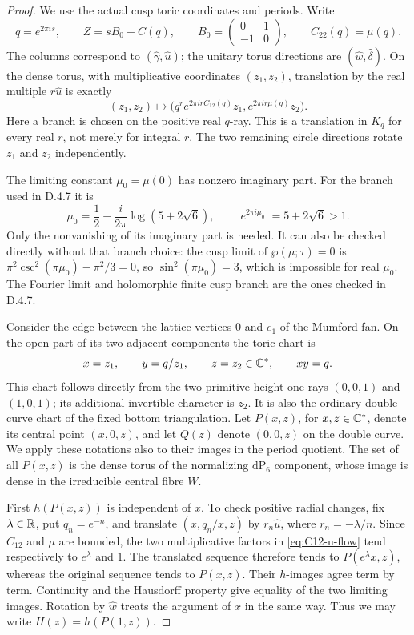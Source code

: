 \begin{proof}
We use the actual cusp toric coordinates and periods. Write
\[
 q=e^{2\pi i s},\qquad
 Z=sB_0+C(q),\qquad
 B_0=\begin{pmatrix}0&1\\-1&0\end{pmatrix},
 \qquad C_{22}(q)=\mu(q).
\]
The columns correspond to $(\widehat\gamma,\widehat u)$;
the unitary torus directions are $(\widehat w,\widehat\delta)$.
On the dense torus, with multiplicative coordinates $(z_1,z_2)$,
translation by the real multiple $r\widehat u$ is exactly
\begin{equation}\label{eq:C12-u-flow}
 (z_1,z_2)\longmapsto
 \bigl(q^r e^{2\pi i r C_{12}(q)}z_1,
             e^{2\pi i r\mu(q)}z_2\bigr).
\end{equation}
Here a branch is chosen on the positive real $q$-ray. This is a
translation in $K_q$ for every real $r$, not merely for integral $r$.
The two remaining circle directions rotate $z_1$ and $z_2$
independently.

The limiting constant $\mu_0=\mu(0)$ has nonzero imaginary part.
For the branch used in D.4.7 it is
\[
 \mu_0=\frac12-\frac{i}{2\pi}\log(5+2\sqrt6),\qquad
 |e^{2\pi i\mu_0}|=5+2\sqrt6>1.
\]
Only the nonvanishing of its imaginary part is needed. It can
also be checked directly without that branch choice: the cusp
limit of $\wp(\mu;\tau)=0$ is
$\pi^2\csc^2(\pi\mu_0)-\pi^2/3=0$, so
$\sin^2(\pi\mu_0)=3$, which is impossible for real $\mu_0$.
The Fourier limit and holomorphic finite cusp branch are the
ones checked in D.4.7.

Consider the edge between the lattice vertices $0$ and $e_1$
of the Mumford fan. On the open part of its two adjacent
components the toric chart is
\[
 x=z_1,\qquad y=q/z_1,\qquad z=z_2\in\mathbb C^*,
 \qquad xy=q.
\]
This chart follows directly from the two primitive height-one
rays $(0,0,1)$ and $(1,0,1)$; its additional invertible character
is $z_2$. It is also the ordinary double-curve chart of the
fixed bottom triangulation. Let $P(x,z)$, for $x,z\in\mathbb C^*$,
denote its central point $(x,0,z)$, and let $Q(z)$ denote
$(0,0,z)$ on the double curve. We apply these notations also
to their images in the period quotient. The set of all $P(x,z)$
is the dense torus of the normalizing $\mathrm{dP}_6$ component,
whose image is dense in the irreducible central fibre $W$.

First $h(P(x,z))$ is independent of $x$. To check positive
radial changes, fix $\lambda\in\mathbb R$, put $q_n=e^{-n}$, and
translate $(x,q_n/x,z)$ by
$r_n\widehat u$, where $r_n=-\lambda/n$. Since $C_{12}$ and
$\mu$ are bounded, the two multiplicative factors in
\eqref{eq:C12-u-flow} tend respectively to $e^\lambda$ and
$1$. The translated sequence therefore tends to $P(e^\lambda x,z)$,
whereas the original sequence tends to $P(x,z)$. Their $h$-images
agree term by term. Continuity and the Hausdorff property give
equality of the two limiting images. Rotation by
$\widehat w$ treats the argument of $x$ in the same way.
Thus we may write $H(z)=h(P(1,z))$.


\end{proof}
